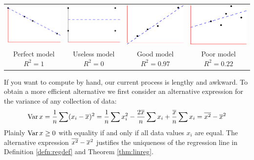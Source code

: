 \begin{center}
	\begin{tabular}{@{}c@{\quad\ }c@{\quad\ }c@{\quad\ }c@{}}
		\includegraphics{reg-rsq1}
		&
		\includegraphics{reg-rsq2}
		&
		\includegraphics{reg-rsq3}
		&
		\includegraphics{reg-rsq4}
		\\
		Perfect model $R^2=1$
		&
		Useless model $R^2=0$
		&
		Good model $R^2=0.97$
		&
		Poor model $R^2=0.22$
	\end{tabular}
\end{center}



If you want to compute by hand, our current process is lengthy and awkward. To obtain a more efficient alternative we first consider an alternative expression for the variance of any collection of data:
\[
	\operatorname{Var} x=\frac 1n\sum(x_i-\overline{x})^2=\frac 1n\sum x_i^2-\frac{2\overline{x}}n\sum x_i+\frac{\overline{x}}n\sum x_i =\overline{x^2}-\overline{x}^2
\]
Plainly $\operatorname{Var} x\ge 0$ with equality if and only if all data values $x_i$ are equal. The alternative expression $\overline{x^2}-\overline{x}^2$ justifies the uniqueness of the regression line in Definition \ref{defn:regdef} and Theorem \ref{thm:linreg}.


